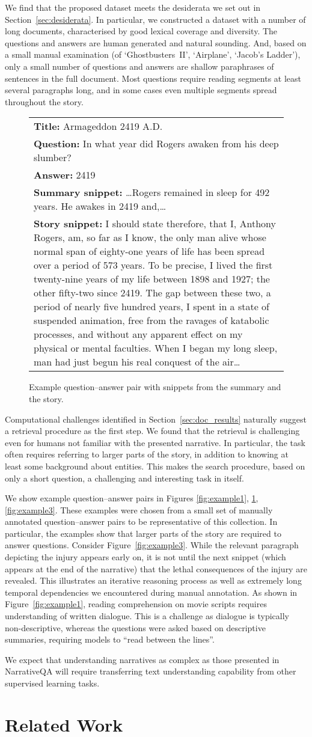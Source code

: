 \documentclass[11pt,letterpaper]{article}
\newcommand{\examplea}[7]{\begin{figure}[tb]
\begin{tabular}{p{0.92\columnwidth}}
\toprule
\noindent \textbf{Title:} #1\\
\textbf{Question:} #2\\
\textbf{Answer:} #3\\
\textbf{Summary snippet:} #4\\
\textbf{Story snippet:} #5 \\
\bottomrule
\end{tabular}
\caption{#6}
\label{#7}
\end{figure}}
\newcommand{\exasizea}{\small}
\newcommand{\armageddonexample}{\examplea{Armageddon 2419 A.D.}
{\exasizea In what year did Rogers awaken from his deep slumber?}
{\exasizea 2419}
{\exasizea\dots Rogers remained in sleep for 492 years. He awakes in 2419 and,\dots}
{\exasizea I should state therefore, that I, Anthony Rogers, am, so far as I know,
the only man alive whose normal span of eighty-one years of life has
been spread over a period of 573 years. To be precise, I lived the first
twenty-nine years of my life between 1898 and 1927; the other fifty-two
since 2419. The gap between these two, a period of nearly five hundred
years, I spent in a state of suspended animation, free from the ravages
of katabolic processes, and without any apparent effect on my physical
or mental faculties. When I began my long sleep, man had just begun his real conquest of the air\dots}
{Example question--answer pair with snippets from the summary and the story.}
{fig:example2}}
\begin{document}
We find that the proposed dataset meets the desiderata we set out in Section~\ref{sec:desiderata}. In particular, we constructed a dataset with a number of long documents, characterised by good lexical coverage and diversity. The questions and answers are human generated and natural sounding. And, based on a small manual examination (of `Ghostbusters~II', `Airplane', `Jacob's Ladder'), only a small number of questions and answers are shallow paraphrases of sentences in the full document. Most questions require reading segments at least several paragraphs long, and in some cases even multiple segments spread throughout the story.


\armageddonexample


Computational challenges identified in Section~\ref{sec:doc_results} naturally suggest a retrieval procedure as the first step.
We found that the retrieval is challenging even for humans not familiar with the presented narrative. In particular, the task often requires referring to larger parts of the story, in addition to knowing at least some background about entities. This makes the search procedure, based on only a short question, a challenging and interesting task in itself. 

We show example question--answer pairs
in Figures \ref{fig:example1}, \ref{fig:example2}, \ref{fig:example3}. These examples were chosen from a small set of manually annotated question--answer pairs to be representative of this collection. In particular, the examples show that larger parts of the story are required to answer questions. Consider Figure~\ref{fig:example3}. While the relevant paragraph depicting the injury appears early on, it is not until the next snippet (which appears at the end of the narrative) that the lethal consequences of the injury are revealed. This illustrates an iterative reasoning process as well as extremely long temporal dependencies we encountered during manual annotation. As shown in Figure~\ref{fig:example1}, reading comprehension on movie scripts requires understanding of written dialogue. This is a challenge as dialogue is typically non-descriptive, whereas the questions were asked based on descriptive summaries, requiring models to ``read between the lines''.

We expect that understanding narratives as complex as those presented in NarrativeQA
will require transferring text understanding capability from other supervised learning tasks.

\section{Related Work}
\end{document}
